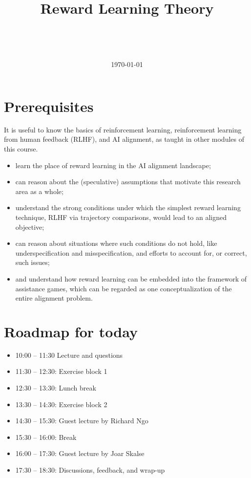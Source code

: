 \documentclass[11pt]{article}
\title{Reward Learning Theory}
\author{
  \authorname{Leon Lang}\\
  \affiliation{Iliad}
  \and
  \authorname{Joar Skalse}\\
  \affiliation{Deducto Limited, King’s College London}
}
\date{\today}
\begin{document}
\maketitle

\section*{Prerequisites}

It is useful to know the basics of reinforcement learning, reinforcement learning from human feedback (RLHF), and AI alignment, as taught in other modules of this course.

\begin{learningoutcomes}
  \begin{itemize}
    \item learn the place of reward learning in the AI alignment landscape;
    \item can reason about the (speculative) assumptions that motivate this research area as a whole;
    \item understand the strong conditions under which the simplest reward learning technique, RLHF via trajectory comparisons, would lead to an aligned objective;
    \item can reason about situations where such conditions do not hold, like underspecification and misspecification, and efforts to account for, or correct, such issues;
    \item and understand how reward learning can be embedded into the framework of assistance games, which can be regarded as one conceptualization of the entire alignment problem.
  \end{itemize}
\end{learningoutcomes}

\section*{Roadmap for today}

\begin{itemize}
  \item 10:00 – 11:30 Lecture and questions
  \item 11:30 – 12:30: Exercise block 1
  \item 12:30 – 13:30: Lunch break
  \item 13:30 – 14:30: Exercise block 2
  \item 14:30 – 15:30: Guest lecture by Richard Ngo
  \item 15:30 – 16:00: Break
  \item 16:00 – 17:30: Guest lecture by Joar Skalse
  \item 17:30 – 18:30: Discussions, feedback, and wrap-up
\end{itemize}
\end{document}
